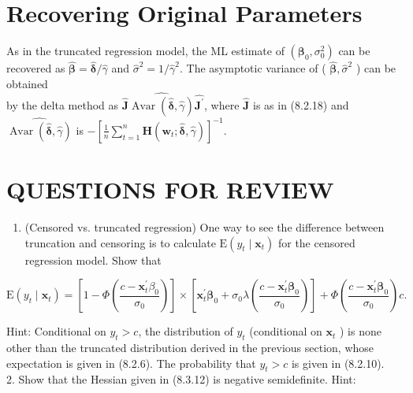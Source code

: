 \documentclass[10pt]{article}
\begin{document}
\section*{Recovering Original Parameters}
As in the truncated regression model, the ML estimate of $\left(\boldsymbol{\beta}_{0}, \sigma_{0}^{2}\right)$ can be recovered as $\widehat{\boldsymbol{\beta}}=\hat{\boldsymbol{\delta}} / \hat{\gamma}$ and $\hat{\sigma}^{2}=1 / \hat{\gamma}^{2}$. The asymptotic variance of ( $\widehat{\boldsymbol{\beta}}, \hat{\sigma}^{2}$ ) can be obtained\\
by the delta method as $\widehat{\mathbf{J}} \widehat{\operatorname{Avar}(\hat{\boldsymbol{\delta}}, \hat{\gamma})} \widehat{\mathbf{J}^{\prime}}$, where $\widehat{\mathbf{J}}$ is as in (8.2.18) and $\widehat{\operatorname{Avar}(\hat{\boldsymbol{\delta}}, \hat{\gamma})}$ is $-\left[\frac{1}{n} \sum_{t=1}^{n} \mathbf{H}\left(\mathbf{w}_{t} ; \hat{\boldsymbol{\delta}}, \hat{\gamma}\right)\right]^{-1}$.

\section*{QUESTIONS FOR REVIEW}
\begin{enumerate}
  \item (Censored vs. truncated regression) One way to see the difference between truncation and censoring is to calculate $\mathrm{E}\left(y_{t} \mid \mathbf{x}_{t}\right)$ for the censored regression model. Show that
\end{enumerate}

$$
\mathrm{E}\left(y_{t} \mid \mathbf{x}_{t}\right)=\left[1-\Phi\left(\frac{c-\mathbf{x}_{t}^{\prime} \beta_{0}}{\sigma_{0}}\right)\right] \times\left[\mathbf{x}_{t}^{\prime} \boldsymbol{\beta}_{0}+\sigma_{0} \lambda\left(\frac{c-\mathbf{x}_{t}^{\prime} \boldsymbol{\beta}_{0}}{\sigma_{0}}\right)\right]+\Phi\left(\frac{c-\mathbf{x}_{t}^{\prime} \boldsymbol{\beta}_{0}}{\sigma_{0}}\right) c .
$$

Hint: Conditional on $y_{t}>c$, the distribution of $y_{t}$ (conditional on $\mathbf{x}_{t}$ ) is none other than the truncated distribution derived in the previous section, whose expectation is given in (8.2.6). The probability that $y_{t}>c$ is given in (8.2.10).\\
2. Show that the Hessian given in (8.3.12) is negative semidefinite. Hint:
\end{document}

